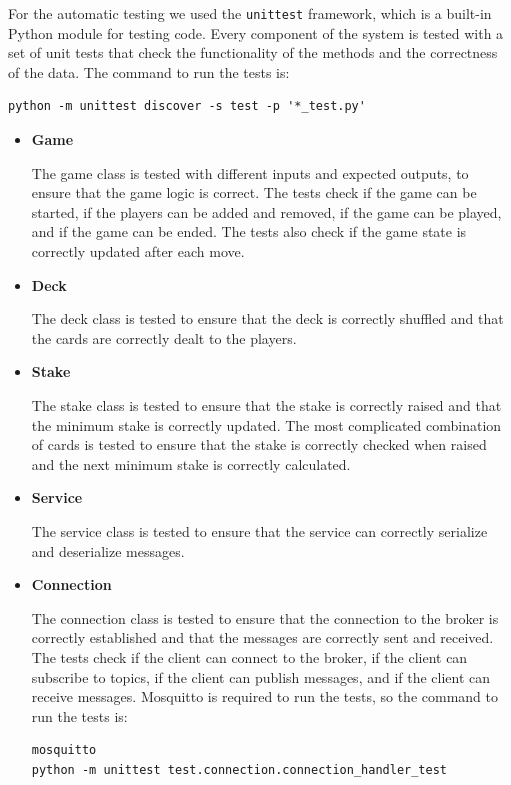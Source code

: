\documentclass{scrartcl}
\begin{document}
For the automatic testing we used the \texttt{unittest} framework, which is a built-in Python module for testing code. Every component of the system is tested with a set of unit tests that check the functionality of the methods and the correctness of the data.
The command to run the tests is:
\begin{verbatim}
python -m unittest discover -s test -p '*_test.py'
\end{verbatim}

\begin{itemize}
      \item \textbf{Game}\par
            The game class is tested with different inputs and expected outputs, to ensure that the game logic is correct. The tests check if the game can be started, if the players can be added and removed, if the game can be played, and if the game can be ended. The tests also check if the game state is correctly updated after each move.
      \item \textbf{Deck}\par
            The deck class is tested to ensure that the deck is correctly shuffled and that the cards are correctly dealt to the players. 
      \item \textbf{Stake}\par
            The stake class is tested to ensure that the stake is correctly raised and that the minimum stake is correctly updated. The most complicated combination of cards is tested to ensure that the stake is correctly checked when raised and the next minimum stake is correctly calculated.
      \item \textbf{Service}\par
            The service class is tested to ensure that the service can correctly serialize and deserialize messages. 
      \item \textbf{Connection}\par
            The connection class is tested to ensure that the connection to the broker is correctly established and that the messages are correctly sent and received. The tests check if the client can connect to the broker, if the client can subscribe to topics, if the client can publish messages, and if the client can receive messages.
            Mosquitto is required to run the tests, so the command to run the tests is:
            \begin{verbatim}
mosquitto
python -m unittest test.connection.connection_handler_test
            \end{verbatim}

\end{itemize}
\end{document}
